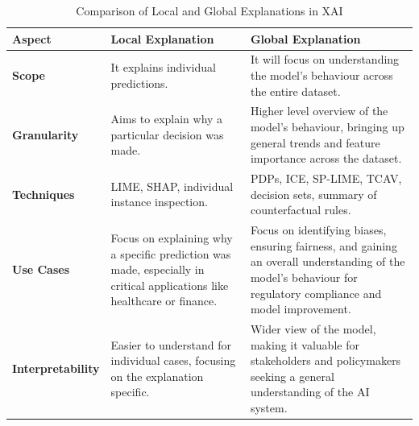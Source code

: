 \documentclass[10pt,journal,compsoc]{IEEEtran}
\begin{document}
\begin{table}[H]
    \centering
    \small
    \begin{tabularx}{\columnwidth}{|p{1.8cm}|X|X|}
        \hline
        \textbf{Aspect}           & \textbf{Local Explanation}                                                                                              & \textbf{Global Explanation}                                                                                                                                    \\
        \hline
        \textbf{Scope}            & It explains individual predictions.                                                                                     & It will focus on understanding the model's behaviour across the entire dataset.                                                                                \\
        \hline
        \textbf{Granularity}      & Aims to explain why a particular decision was made.                                                                     & Higher level overview of the model's behaviour, bringing up general trends and feature importance across the dataset.                                          \\
        \hline
        \textbf{Techniques}       & LIME, SHAP, individual instance inspection.                                                                             & PDPs, ICE, SP-LIME, TCAV, decision sets, summary of counterfactual rules.\cite{phillips2020four}                                                               \\
        \hline
        \textbf{Use Cases}        & Focus on explaining why a specific prediction was made, especially in critical applications like healthcare or finance. & Focus on identifying biases, ensuring fairness, and gaining an overall understanding of the model's behaviour for regulatory compliance and model improvement. \\
        \hline
        \textbf{Interpretability} & Easier to understand for individual cases, focusing on the explanation specific.                                        & Wider view of the model, making it valuable for stakeholders and policymakers seeking a general understanding of the AI system.                                \\
        \hline
    \end{tabularx}
    \caption{Comparison of Local and Global Explanations in XAI}
    \label{tab:xai_comparison}
\end{table}
\end{document}
